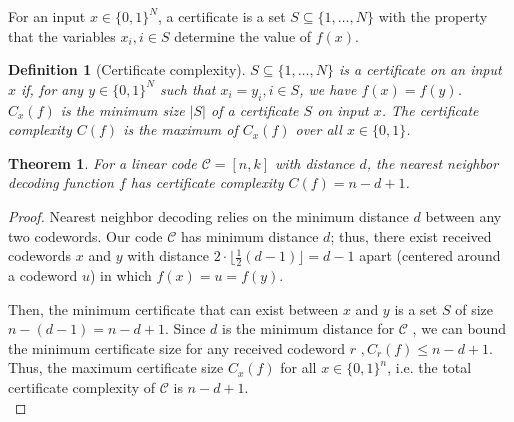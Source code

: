 \documentclass[12pt]{article}
\newtheorem{theorem}{Theorem}
\newtheorem{definition}{Definition}
\begin{document}
For an input $x \in \{0,1\}^N$, a certificate is a set $S \subseteq \{1, \ldots, N\}$ with the property that the variables $x_i, i \in S$ determine the value of $f(x)$. 
 
\begin{definition}[Certificate complexity] $S \subseteq \{1, \ldots, N\}$ is a certificate on an input $x$ if, for any $y \in \{0,1\}^N$ such that $x_i = y_i, i \in S$, we have $f(x) = f(y)$. $C_x(f)$ is the minimum size $\lvert S \rvert$ of a certificate $S$ on input $x$. The certificate complexity $C(f)$ is the maximum of $C_x(f)$ over all $x\in \{0,1\}$.
\end{definition}

\begin{theorem}
For a linear code $\mathscr{C} = [n,k]$ with distance $d$, the nearest neighbor decoding function $f$ has certificate complexity $C(f) = n -d +1$.
\end{theorem}

\begin{proof}
Nearest neighbor decoding relies on the minimum distance $d$ between any two codewords. Our code $\mathscr{C} $ has minimum distance $d$; thus, there exist received codewords $x$ and $y$ with distance $2 \cdot \lfloor \frac{1}{2}(d-1)\rfloor = d-1$ apart (centered around a codeword $u$) in which $f(x) = u = f(y)$. 

Then, the minimum certificate that can exist between $x$ and $y$ is a set $S$ of size $n-(d-1) = n-d+1$. Since $d$ is the minimum distance for $\mathscr{C}$ , we can bound the minimum certificate size for any received codeword $r$ $, C_r(f) \leq n - d +1.$ Thus, the maximum certificate size $C_x(f)$ for all $x \in \{0,1\}^n$, i.e. the total certificate complexity of $\mathscr{C}$ is $n-d+1$.\\
\end{proof}
\end{document}
